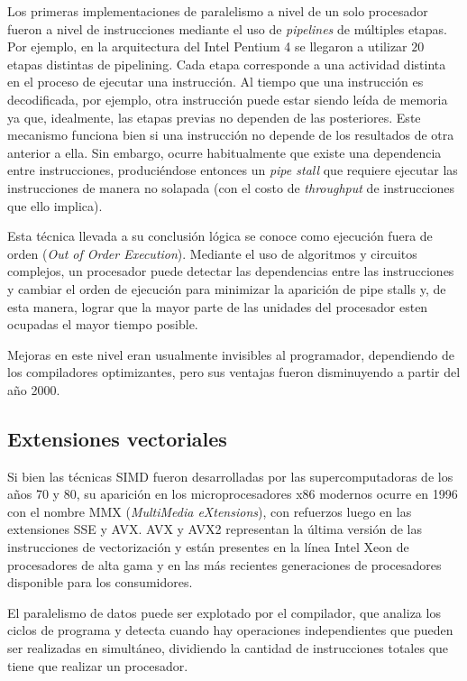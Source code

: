 Los primeras implementaciones de paralelismo a nivel de un solo procesador fueron a nivel de instrucciones mediante el uso de \textit{pipelines} de m\'ultiples etapas.
Por ejemplo, en la arquitectura del Intel Pentium 4 se llegaron a utilizar $20$ etapas distintas de pipelining.
Cada etapa corresponde a una actividad distinta en el proceso de ejecutar una instrucci\'on.
Al tiempo que una instrucci\'on es decodificada, por ejemplo, otra instrucci\'on puede estar siendo le\'ida de memoria ya que, idealmente, las etapas previas no dependen de las posteriores.
Este mecanismo funciona bien si una instrucci\'on no depende de los resultados de otra anterior a ella.
Sin embargo, ocurre habitualmente que existe una dependencia entre instrucciones, produci\'endose entonces un \textit{pipe stall} que requiere ejecutar las instrucciones de manera no solapada (con el costo de \textit{throughput} de instrucciones que ello implica).

Esta t\'ecnica llevada a su conclusi\'on l\'ogica se conoce como ejecuci\'on fuera de orden (\textit{Out of Order Execution}).
Mediante el uso de algoritmos y circuitos complejos, un procesador puede detectar las dependencias entre las instrucciones y cambiar el orden de ejecuci\'on para minimizar la aparici\'on de pipe stalls y, de esta manera, lograr que la mayor parte de las unidades del procesador esten ocupadas el mayor tiempo posible.

Mejoras en este nivel eran usualmente invisibles al programador, dependiendo de los compiladores optimizantes, pero sus ventajas fueron disminuyendo a partir del a\~no 2000.

\subsection{Extensiones vectoriales}

Si bien las t\'ecnicas SIMD fueron desarrolladas por las supercomputadoras de los a\~nos 70 y 80, su aparici\'on en los microprocesadores x86 modernos ocurre en 1996 con el nombre MMX (\textit{MultiMedia eXtensions}), con refuerzos luego en las extensiones SSE y AVX.
AVX y AVX2 representan la \'ultima versi\'on de las instrucciones de vectorizaci\'on y est\'an presentes en la l\'inea Intel Xeon de procesadores de alta gama y en las m\'as recientes generaciones de procesadores disponible para los consumidores.

El paralelismo de datos puede ser explotado por el compilador, que analiza los ciclos de programa y detecta cuando hay operaciones independientes que pueden ser realizadas en simult\'aneo, dividiendo la cantidad de instrucciones totales que tiene que realizar un procesador.

